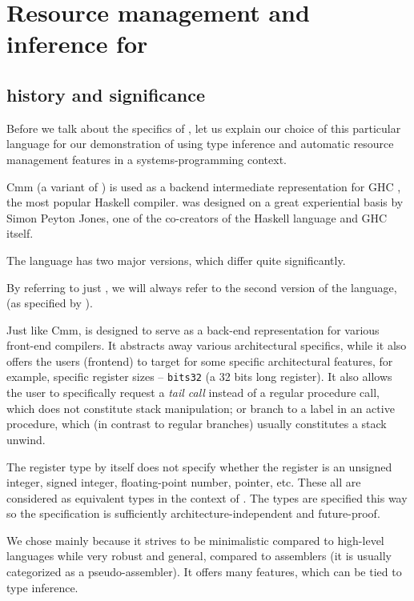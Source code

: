 \chapter{Resource management and inference for \cmm}

\label{chap2}

\section{\cmm history and significance}

Before we talk about the specifics of \cmm, let us explain our choice of this particular language for our demonstration of using type inference and automatic resource management features in a systems-programming context.

Cmm (a variant of \cmm) is used as a backend intermediate representation for GHC \cite{haskellbackends}, the most popular Haskell compiler. \cmm was designed on a great experiential basis by Simon Peyton Jones, one of the co-creators of the Haskell language and GHC itself.

\begin{remark}
    The \cmm language has two major versions, which differ quite significantly.

    By referring to just \cmm, we will always refer to the second version of the language,  (as specified by \citet{ramsey2005c}).
\end{remark}

Just like Cmm, \cmm is designed to serve as a back-end representation for various front-end compilers. It abstracts away various architectural specifics, while it also offers the users (frontend) to target for some specific architectural features, for example, specific register sizes -- \lstinline{bits32} (a 32 bits long register). It also allows the user to specifically request a \emph{tail call} instead of a regular procedure call, which does not constitute stack manipulation; or  branch to a  label in an active procedure, which (in contrast to regular branches) usually constitutes a stack unwind.

The register type by itself does not specify whether the register is an unsigned integer, signed integer, floating-point number, pointer, etc. These all are considered as equivalent types in the context of \cmm. The types are specified this way so the specification is sufficiently architecture-independent and future-proof.

We chose \cmm mainly because it strives to be minimalistic compared to high-level languages while very robust and general, compared to assemblers (it is usually categorized as a pseudo-assembler). It offers many features, which can be tied to type inference.



